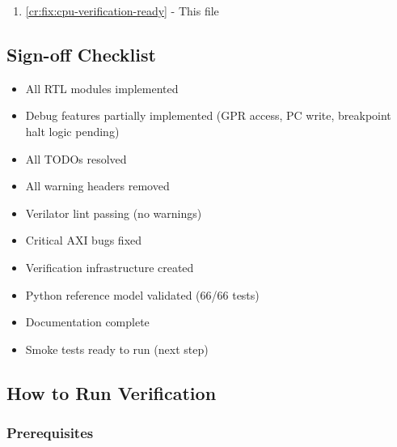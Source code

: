 \begin{record}

\begin{enumerate}
\def\labelenumi{\arabic{enumi}.}
\tightlist
\item
  \cref{cr:fix:cpu-verification-ready} - This file
\end{enumerate}

\end{record}

\subsection{Sign-off Checklist}\label{cr:fix:cpu-verification-ready:sign-off-checklist}

\begin{record}

\begin{itemize}
\tightlist
\item
  \ok{} All RTL modules implemented
\item
  \wip{} Debug features partially implemented (GPR access, PC write,
  breakpoint halt logic pending)
\item
  \ok{} All TODOs resolved
\item
  \ok{} All warning headers removed
\item
  \ok{} Verilator lint passing (no warnings)
\item
  \ok{} Critical AXI bugs fixed
\item
  \ok{} Verification infrastructure created
\item
  \ok{} Python reference model validated (66/66 tests)
\item
  \ok{} Documentation complete
\item
  \wip{} Smoke tests ready to run (next step)
\end{itemize}

\end{record}

\subsection{How to Run Verification}\label{cr:fix:cpu-verification-ready:how-to-run-verification}

\subsubsection{Prerequisites}\label{cr:fix:cpu-verification-ready:prerequisites}

